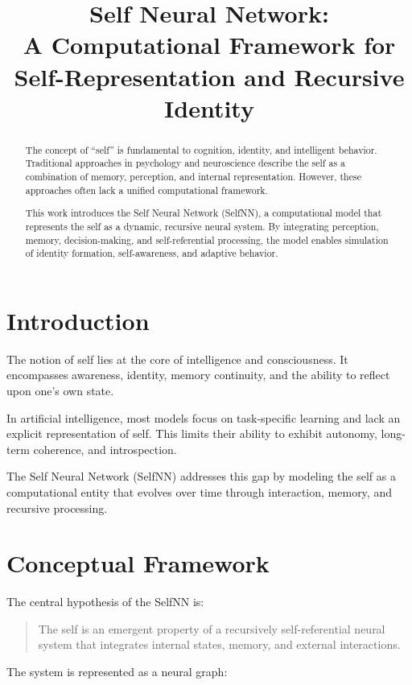 \documentclass[12pt]{article}
\title{\textbf{Self Neural Network: \\ A Computational Framework for Self-Representation and Recursive Identity}}
\author{}
\date{}
\begin{document}
\maketitle

\begin{abstract}
The concept of “self” is fundamental to cognition, identity, and intelligent behavior. Traditional approaches in psychology and neuroscience describe the self as a combination of memory, perception, and internal representation. However, these approaches often lack a unified computational framework.

This work introduces the Self Neural Network (SelfNN), a computational model that represents the self as a dynamic, recursive neural system. By integrating perception, memory, decision-making, and self-referential processing, the model enables simulation of identity formation, self-awareness, and adaptive behavior.
\end{abstract}

\section{Introduction}

The notion of self lies at the core of intelligence and consciousness. It encompasses awareness, identity, memory continuity, and the ability to reflect upon one's own state.

In artificial intelligence, most models focus on task-specific learning and lack an explicit representation of self. This limits their ability to exhibit autonomy, long-term coherence, and introspection.

The Self Neural Network (SelfNN) addresses this gap by modeling the self as a computational entity that evolves over time through interaction, memory, and recursive processing.

\section{Conceptual Framework}

The central hypothesis of the SelfNN is:

\begin{quote}
The self is an emergent property of a recursively self-referential neural system that integrates internal states, memory, and external interactions.
\end{quote}

The system is represented as a neural graph:
\end{document}
